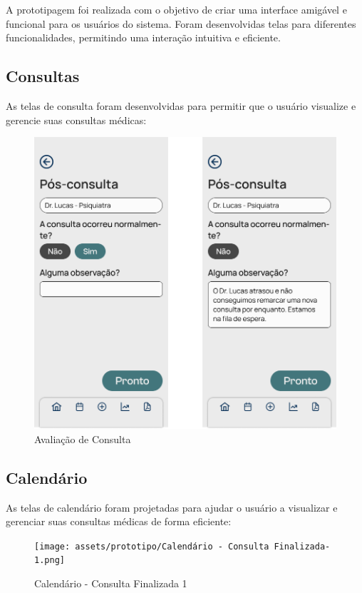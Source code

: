 \pagebreak

A prototipagem foi realizada com o objetivo de criar uma interface amigável e funcional para os usuários do sistema. Foram desenvolvidas telas para diferentes funcionalidades, permitindo uma interação intuitiva e eficiente.

\subsection{Consultas}

As telas de consulta foram desenvolvidas para permitir que o usuário visualize e gerencie suas consultas médicas:

\begin{figure}[!htbp]
	\centering
	\includegraphics[width=1.0\linewidth]{assets/prototipo/Avaliação Consulta.png}
	\caption{Avaliação de Consulta}
	\label{avaliacao_consulta}
\end{figure}

\subsection{Calendário}

As telas de calendário foram projetadas para ajudar o usuário a visualizar e gerenciar suas consultas médicas de forma eficiente:

\begin{figure}[!htbp]
	\centering
	\texttt{[image: assets/prototipo/Calendário - Consulta Finalizada-1.png]}
	\caption{Calendário - Consulta Finalizada 1}
	\label{calendario_consulta_finalizada_1}
\end{figure}

